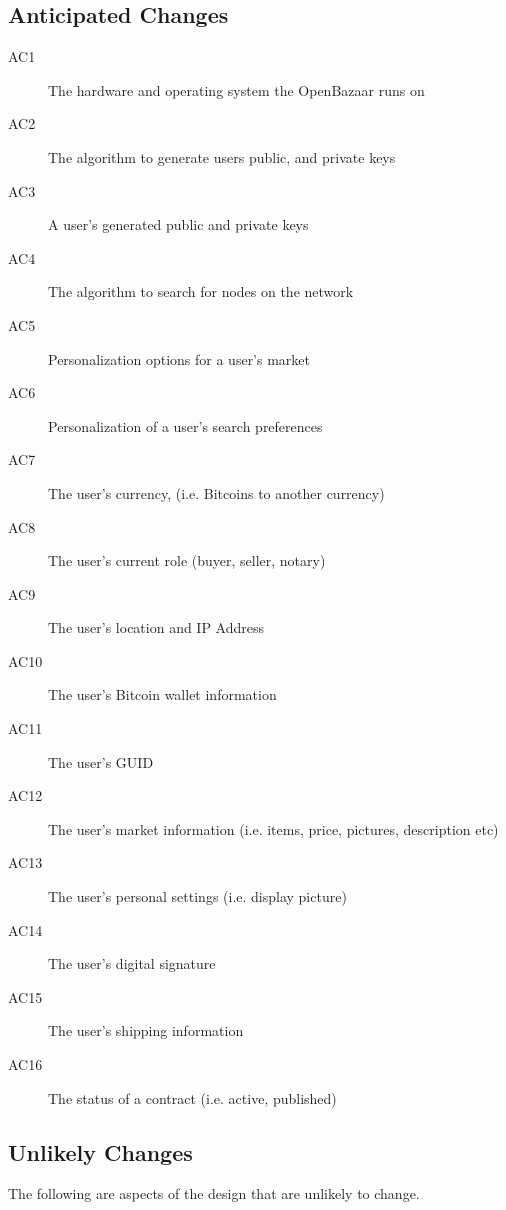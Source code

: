 \documentclass{article}
\begin{document}
\subsection{Anticipated Changes}
\begin{description}
	\item[AC1]
	The hardware and operating system the OpenBazaar runs on
	\item[AC2]
	The algorithm to generate users public, and private keys	
	\item[AC3]
	A user's generated public and private keys
	\item[AC4]
	The algorithm to search for nodes on the network
	\item[AC5]
	Personalization options for a user's market
	\item[AC6]
	Personalization of a user's search preferences
	\item[AC7]
	The user's currency, (i.e. Bitcoins to another currency)
	\item[AC8]
	The user's current role (buyer, seller, notary)
	\item[AC9]
	The user's location and IP Address
	\item[AC10]
	The user's Bitcoin wallet information
	\item[AC11]
	The user's GUID
	\item[AC12]
	The user's market information (i.e. items, price, pictures, description etc)
	\item[AC13]
	The user's personal settings (i.e. display picture)
	\item[AC14]
	The user's digital signature
	\item[AC15]
	The user's shipping information
	\item[AC16]
	The status of a contract (i.e. active, published)
\end{description}

\subsection{Unlikely Changes}

The following are aspects of the design that are unlikely to change.
\end{document}
